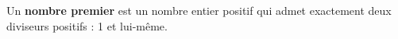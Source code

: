 
Un \textbf{nombre premier} est un nombre entier positif qui admet exactement deux diviseurs positifs : 1 et lui-même.

